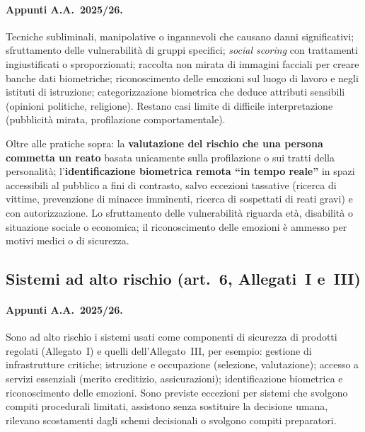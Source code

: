 \paragraph{Appunti A.A.~2025/26.} Tecniche subliminali, manipolative o ingannevoli che causano danni
significativi; sfruttamento delle vulnerabilità di gruppi specifici; \emph{social scoring} con
trattamenti ingiustificati o sproporzionati; raccolta non mirata di immagini facciali per creare banche
dati biometriche; riconoscimento delle emozioni sul luogo di lavoro e negli istituti di istruzione;
categorizzazione biometrica che deduce attributi sensibili (opinioni politiche, religione). Restano casi
limite di difficile interpretazione (pubblicità mirata, profilazione comportamentale).

\begin{integrazione}
Oltre alle pratiche sopra: la \textbf{valutazione del rischio che una persona commetta un reato} basata
unicamente sulla profilazione o sui tratti della personalità; l'\textbf{identificazione biometrica
remota ``in tempo reale''} in spazi accessibili al pubblico a fini di contrasto, salvo eccezioni tassative
(ricerca di vittime, prevenzione di minacce imminenti, ricerca di sospettati di reati gravi) e con
autorizzazione. Lo sfruttamento delle vulnerabilità riguarda età, disabilità o situazione sociale o
economica; il riconoscimento delle emozioni è ammesso per motivi medici o di sicurezza.
\end{integrazione}

\subsection{Sistemi ad alto rischio (art.~6, Allegati~I e~III)}
\label{sec:aiact-altorischio}
\paragraph{Appunti A.A.~2025/26.} Sono ad alto rischio i sistemi usati come componenti di sicurezza di
prodotti regolati (Allegato~I) e quelli dell'Allegato~III, per esempio: gestione di infrastrutture
critiche; istruzione e occupazione (selezione, valutazione); accesso a servizi essenziali (merito
creditizio, assicurazioni); identificazione biometrica e riconoscimento delle emozioni. Sono previste
eccezioni per sistemi che svolgono compiti procedurali limitati, assistono senza sostituire la decisione
umana, rilevano scostamenti dagli schemi decisionali o svolgono compiti preparatori.

